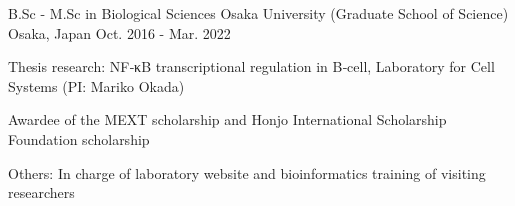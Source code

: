 \begin{cventries}

  \cventry
    {B.Sc - M.Sc in Biological Sciences} %
    {Osaka University (Graduate School of Science)} %
    {Osaka, Japan} %
    {Oct. 2016 - Mar. 2022} %
    {
      \begin{cvitems} %
        \item {Thesis research: NF‑κB transcriptional regulation in B‑cell, Laboratory for Cell Systems (PI: Mariko Okada)}
        \item {Awardee of the MEXT scholarship and Honjo International Scholarship Foundation scholarship}
        \item {Others: In charge of laboratory website and bioinformatics training of visiting researchers}
      \end{cvitems}
    }

\end{cventries}